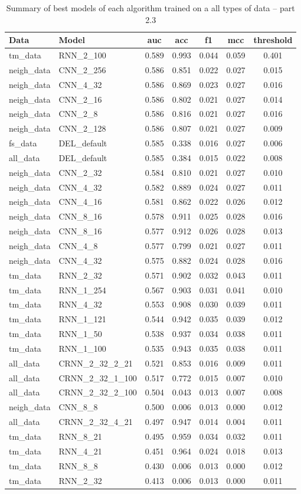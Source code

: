 \documentclass[thesis=M,english]{FITthesis}[2012/10/20]
\begin{document}
\begin{table}[H]\centering
\begin{small}
    \caption{Summary of best models of each algorithm trained on a all types of data -- part 2.3}\label{tab:all_data_summary_2_3}
    \begin{tabular}{|l|l|c|c|c|c|c|}\hline
        Data & Model & \gls{auc} & \gls{acc} & \gls{f1} & \gls{mcc} & threshold \tabularnewline \hline \hline
tm\_data & RNN\_2\_100 & 0.589 & 0.993 & 0.044 & 0.059 & 0.401 \tabularnewline  \hline 
neigh\_data & CNN\_2\_256 & 0.586 & 0.851 & 0.022 & 0.027 & 0.015 \tabularnewline  \hline 
neigh\_data & CNN\_4\_32 & 0.586 & 0.869 & 0.023 & 0.027 & 0.016 \tabularnewline  \hline 
neigh\_data & CNN\_2\_16 & 0.586 & 0.802 & 0.021 & 0.027 & 0.014 \tabularnewline  \hline 
neigh\_data & CNN\_2\_8 & 0.586 & 0.816 & 0.021 & 0.027 & 0.016 \tabularnewline  \hline 
neigh\_data & CNN\_2\_128 & 0.586 & 0.807 & 0.021 & 0.027 & 0.009 \tabularnewline  \hline 
fs\_data & DEL\_default & 0.585 & 0.338 & 0.016 & 0.027 & 0.006 \tabularnewline  \hline 
all\_data & DEL\_default & 0.585 & 0.384 & 0.015 & 0.022 & 0.008 \tabularnewline  \hline 
neigh\_data & CNN\_2\_32 & 0.584 & 0.810 & 0.021 & 0.027 & 0.010 \tabularnewline  \hline 
neigh\_data & CNN\_4\_32 & 0.582 & 0.889 & 0.024 & 0.027 & 0.011 \tabularnewline  \hline 
neigh\_data & CNN\_4\_16 & 0.581 & 0.862 & 0.022 & 0.026 & 0.012 \tabularnewline  \hline 
neigh\_data & CNN\_8\_16 & 0.578 & 0.911 & 0.025 & 0.028 & 0.016 \tabularnewline  \hline 
neigh\_data & CNN\_8\_16 & 0.577 & 0.912 & 0.026 & 0.028 & 0.013 \tabularnewline  \hline 
neigh\_data & CNN\_4\_8 & 0.577 & 0.799 & 0.021 & 0.027 & 0.011 \tabularnewline  \hline 
neigh\_data & CNN\_4\_32 & 0.575 & 0.882 & 0.024 & 0.028 & 0.016 \tabularnewline  \hline 
tm\_data & RNN\_2\_32 & 0.571 & 0.902 & 0.032 & 0.043 & 0.011 \tabularnewline  \hline 
tm\_data & RNN\_1\_254 & 0.567 & 0.903 & 0.031 & 0.041 & 0.010 \tabularnewline  \hline 
tm\_data & RNN\_4\_32 & 0.553 & 0.908 & 0.030 & 0.039 & 0.011 \tabularnewline  \hline 
tm\_data & RNN\_1\_121 & 0.544 & 0.942 & 0.035 & 0.039 & 0.012 \tabularnewline  \hline 
tm\_data & RNN\_1\_50 & 0.538 & 0.937 & 0.034 & 0.038 & 0.011 \tabularnewline  \hline 
tm\_data & RNN\_1\_100 & 0.535 & 0.943 & 0.035 & 0.038 & 0.011 \tabularnewline  \hline 
all\_data & CRNN\_2\_32\_2\_21 & 0.521 & 0.853 & 0.016 & 0.009 & 0.011 \tabularnewline  \hline 
all\_data & CRNN\_2\_32\_1\_100 & 0.517 & 0.772 & 0.015 & 0.007 & 0.010 \tabularnewline  \hline 
all\_data & CRNN\_2\_32\_2\_100 & 0.504 & 0.043 & 0.013 & 0.007 & 0.008 \tabularnewline  \hline 
neigh\_data & CNN\_8\_8 & 0.500 & 0.006 & 0.013 & 0.000 & 0.012 \tabularnewline  \hline 
all\_data & CRNN\_2\_32\_4\_21 & 0.497 & 0.947 & 0.014 & 0.004 & 0.011 \tabularnewline  \hline 
tm\_data & RNN\_8\_21 & 0.495 & 0.959 & 0.034 & 0.032 & 0.011 \tabularnewline  \hline 
tm\_data & RNN\_4\_21 & 0.451 & 0.964 & 0.024 & 0.018 & 0.013 \tabularnewline  \hline 
tm\_data & RNN\_8\_8 & 0.430 & 0.006 & 0.013 & 0.000 & 0.012 \tabularnewline  \hline 
tm\_data & RNN\_2\_32 & 0.413 & 0.006 & 0.013 & 0.000 & 0.011 \tabularnewline  \hline 
    \end{tabular}
\end{small}
\end{table}
\end{document}
